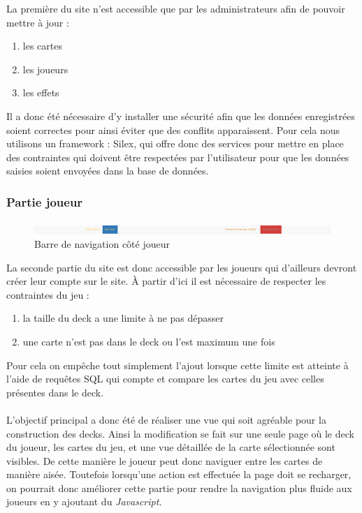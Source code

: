 \documentclass[a4paper,11pt]{report}
\begin{document}
	 La première du site n'est accessible que par les administrateurs afin de pouvoir mettre à jour : 
	\begin{enumerate}
		\item les cartes
		\item les joueurs
		\item les effets
	\end{enumerate}Il a donc été nécessaire d'y installer une sécurité afin que les données enregistrées soient correctes pour ainsi éviter que des conflits apparaissent. Pour cela nous utilisons un framework : Silex, qui offre donc des services pour mettre en place des contraintes qui doivent être respectées par l'utilisateur pour que les données saisies soient envoyées dans la base de données.

	\newpage

	\subsubsection{Partie joueur}
	\paragraph{}

	\begin{figure}[th]
      	 \begin{center}
          \includegraphics[scale=0.25]{Assets/navbar_joueur.png}
          \caption{Barre de navigation côté joueur}
          \label{RepTravail}
         \end{center}
        \end{figure}

      La seconde partie du site est donc accessible par les joueurs qui d'ailleurs devront créer leur compte sur le site. À partir d'ici il est nécessaire de respecter les contraintes du jeu : 

	\begin{enumerate}
		\item la taille du deck a une limite à ne pas dépasser
		\item une carte n'est pas dans le deck ou l'est maximum une fois
	\end{enumerate}Pour cela on empêche tout simplement l'ajout lorsque cette limite est atteinte à l'aide de requêtes SQL qui compte et compare les cartes du jeu avec celles présentes dans le deck.
	
	\paragraph{}
	L'objectif principal a donc été de réaliser une vue qui soit agréable pour la construction des decks. Ainsi la modification se fait sur une seule page où le deck du joueur, les cartes du jeu, et une vue détaillée de la carte sélectionnée sont visibles. De cette manière le joueur peut donc naviguer entre les cartes de manière aisée. Toutefois lorsqu'une action est effectuée la page doit se recharger, on pourrait donc améliorer cette partie pour rendre la navigation plus fluide aux joueurs en y ajoutant du \textit{Javascript}.
\end{document}
